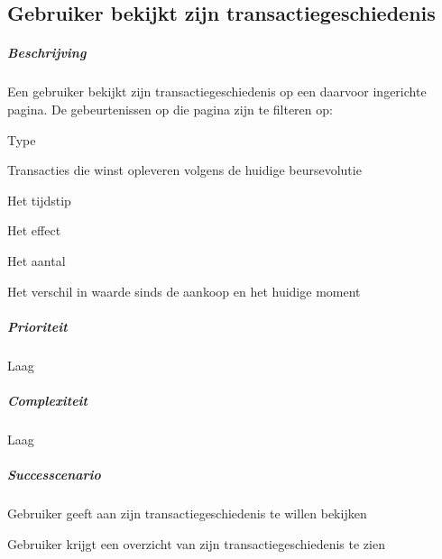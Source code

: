 \subsection{Gebruiker bekijkt zijn transactiegeschiedenis}
\begin{compact}
\subparagraph{Beschrijving} Een gebruiker bekijkt zijn transactiegeschiedenis op een daarvoor ingerichte pagina. De gebeurtenissen op die pagina zijn te filteren op:
\begin{itemize_compact}
	\item Type
	\item Transacties die winst opleveren volgens de huidige beursevolutie
	\item Het tijdstip
	\item Het effect
	\item Het aantal
	\item Het verschil in waarde sinds de aankoop en het huidige moment
\end{itemize_compact}
\subparagraph{Prioriteit}Laag
\subparagraph{Complexiteit}Laag
\subparagraph{Successcenario}
\begin{enumerate_compact}
 \item Gebruiker geeft aan zijn transactiegeschiedenis te willen bekijken
 \item Gebruiker krijgt een overzicht van zijn transactiegeschiedenis te zien
\end{enumerate_compact}
\end{compact}

